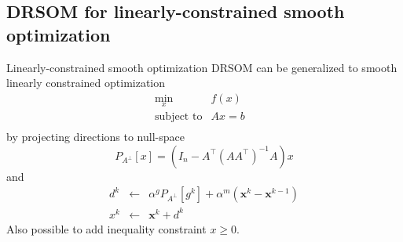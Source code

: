 \documentclass{beamer}
\numberwithin{equation}{section}
\newcommand{\x}{\bm{x}}
\begin{document}
\subsection{DRSOM for linearly-constrained smooth optimization}
\begin{frame}{Linearly-constrained smooth optimization}
\small
DRSOM can be generalized to smooth linearly constrained optimization
\begin{eqnarray*}
  \min_{x} & f(x)\\
  \text{subject to} & A x = b & \\
\end{eqnarray*}
by projecting directions to null-space
$$P_{A^\bot}[x] = (I_n - A^\top(A A^\top)^{-1}A)x$$
and 
\begin{eqnarray*}
  d^k & \leftarrow & \alpha^g P_{A^\bot}[g^k] +\alpha^m ( \x^k - \x^{k - 1} )\\
  x^k & \leftarrow & \x^k + d^k
\end{eqnarray*}
Also possible to add inequality constraint $x\geq0$.
\end{frame}
\end{document}
